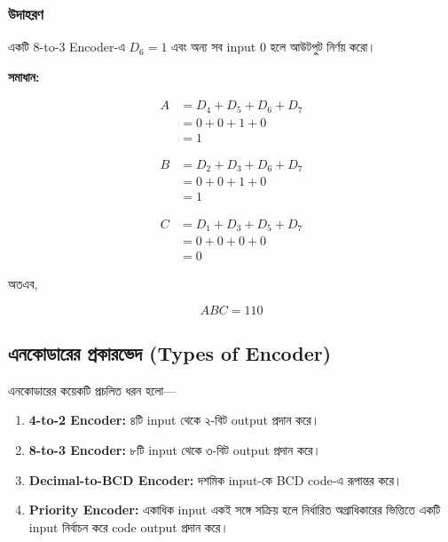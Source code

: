 \subsubsection*{উদাহরণ}

একটি \textenglish{8-to-3 Encoder}-এ
\(D_6=1\) এবং অন্য সব \textenglish{input} \(0\)
হলে আউটপুট নির্ণয় করো।

\textbf{সমাধান:}

\[
\begin{aligned}
A
&=D_4+D_5+D_6+D_7\\
&=0+0+1+0\\
&=1
\end{aligned}
\]

\[
\begin{aligned}
B
&=D_2+D_3+D_6+D_7\\
&=0+0+1+0\\
&=1
\end{aligned}
\]

\[
\begin{aligned}
C
&=D_1+D_3+D_5+D_7\\
&=0+0+0+0\\
&=0
\end{aligned}
\]

অতএব,

\[
\boxed{ABC=110}
\]



\subsection{এনকোডারের প্রকারভেদ
(\textenglish{Types of Encoder})}

এনকোডারের কয়েকটি প্রচলিত ধরন হলো—

\begin{enumerate}[leftmargin=*,itemsep=2pt]

    \item \textbf{\textenglish{4-to-2 Encoder}:}
    ৪টি \textenglish{input} থেকে ২-বিট
    \textenglish{output} প্রদান করে।

    \item \textbf{\textenglish{8-to-3 Encoder}:}
    ৮টি \textenglish{input} থেকে ৩-বিট
    \textenglish{output} প্রদান করে।

    \item \textbf{\textenglish{Decimal-to-BCD Encoder}:}
    দশমিক \textenglish{input}-কে
    \textenglish{BCD code}-এ রূপান্তর করে।

    \item \textbf{\textenglish{Priority Encoder}:}
    একাধিক \textenglish{input} একই সঙ্গে সক্রিয় হলে
    নির্ধারিত অগ্রাধিকারের ভিত্তিতে একটি
    \textenglish{input} নির্বাচন করে
    \textenglish{code output} প্রদান করে।

\end{enumerate}

